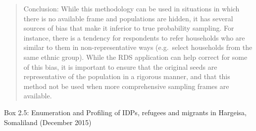 \documentclass[
]{article}
\begin{document}
\begin{quote}
Conclusion: While this methodology can be used in situations in which there is no available frame and populations are hidden, it has several sources of bias that make it inferior to true probability sampling. For instance, there is a tendency for respondents to refer households who are similar to them in non-representative ways (e.g.~select households from the same ethnic group). While the RDS application can help correct for some of this bias, it is important to ensure that the original seeds are representative of the population in a rigorous manner, and that this method not be used when more comprehensive sampling frames are available.
\end{quote}

Box 2.5: Enumeration and Profiling of IDPs, refugees and migrants in
Hargeisa, Somaliland (December 2015)
\end{document}
